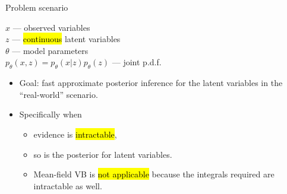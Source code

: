 \documentclass[unicode,11pt]{beamer}
\begin{document}
\begin{frame}[fragile]{Problem scenario}
  \begin{center}
    \begin{minipage}[t]{.3\linewidth}
    \end{minipage}
    \begin{minipage}[t]{.55\linewidth}
      $x$ --- observed variables\\
      $z$ --- \hl{continuous} latent variables\\
      $\theta$ --- model parameters\\
      $p_{\theta}(x, z) = p_{\theta}(x|z) p_{\theta}(z)$ --- joint p.d.f.\\
    \end{minipage}
  \end{center}

  \begin{itemize}
  \item Goal: fast approximate posterior inference for the latent variables
    in the ``real-world'' scenario.
  \item Specifically when
    \begin{itemize}
    \item evidence is \hl{intractable},
    \item so is the posterior for latent variables.
    \item Mean-field VB is \hl{not applicable} because the integrals
      required are intractable as well.
    \end{itemize}
  \end{itemize}

\end{frame}
\end{document}
